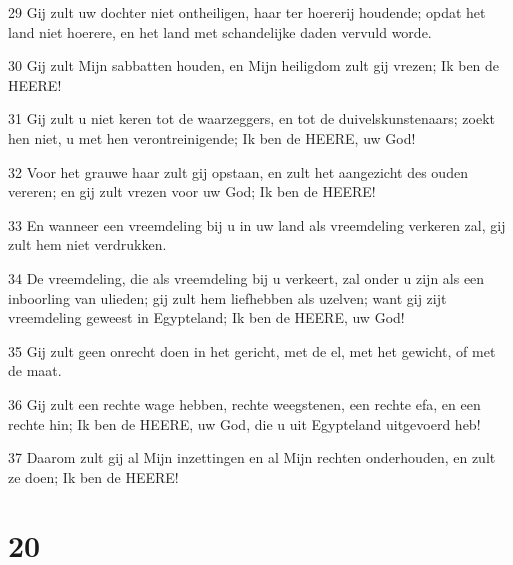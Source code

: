 \par 29 Gij zult uw dochter niet ontheiligen, haar ter hoererij houdende; opdat het land niet hoerere, en het land met schandelijke daden vervuld worde.
\par 30 Gij zult Mijn sabbatten houden, en Mijn heiligdom zult gij vrezen; Ik ben de HEERE!
\par 31 Gij zult u niet keren tot de waarzeggers, en tot de duivelskunstenaars; zoekt hen niet, u met hen verontreinigende; Ik ben de HEERE, uw God!
\par 32 Voor het grauwe haar zult gij opstaan, en zult het aangezicht des ouden vereren; en gij zult vrezen voor uw God; Ik ben de HEERE!
\par 33 En wanneer een vreemdeling bij u in uw land als vreemdeling verkeren zal, gij zult hem niet verdrukken.
\par 34 De vreemdeling, die als vreemdeling bij u verkeert, zal onder u zijn als een inboorling van ulieden; gij zult hem liefhebben als uzelven; want gij zijt vreemdeling geweest in Egypteland; Ik ben de HEERE, uw God!
\par 35 Gij zult geen onrecht doen in het gericht, met de el, met het gewicht, of met de maat.
\par 36 Gij zult een rechte wage hebben, rechte weegstenen, een rechte efa, en een rechte hin; Ik ben de HEERE, uw God, die u uit Egypteland uitgevoerd heb!
\par 37 Daarom zult gij al Mijn inzettingen en al Mijn rechten onderhouden, en zult ze doen; Ik ben de HEERE!

\chapter{20}


